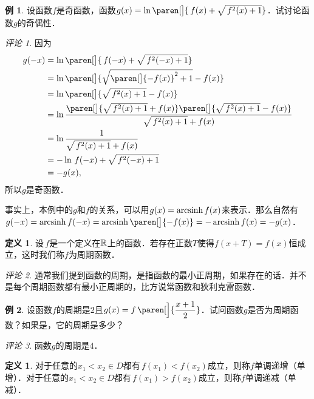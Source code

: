 \documentclass[a4paper,punct=CCT]{ctexbook}
\theoremstyle{definition}
\newtheorem{definition}{定义}
\newtheorem*{definition*}{定义}
\newtheorem*{example*}{例}
\theoremstyle{remark}
\newtheorem*{remark}{评论}
\begin{document}
\begin{example*}
  设函数\(f\)是奇函数，函数\(g(x) = \ln\paren[\big]{\,f(x) + \sqrt{\,f^2(x)+1}}\)．试讨论函数\(g\)的奇偶性．

  \begin{remark}
    因为
    \[
      \begin{split}
        g(-x)
        &= \ln\paren[\big]{\,f(-x) + \sqrt{\,f^2(-x)+1}} \\
        &= \ln\paren[\big]{\sqrt{\paren[\big]{-f(x)}^2+1} - f(x)} \\
        &= \ln\paren[\big]{\sqrt{\,f^2(x)+1} - f(x)} \\
        &= \ln{\frac{\paren[\big]{\sqrt{\,f^2(x)+1} + f(x)}\paren[\big]{\sqrt{\,f^2(x)+1} - f(x)}}{\sqrt{\,f^2(x)+1} + f(x)}} \\
        &= \ln \frac1{\sqrt{\,f^2(x)+1} + f(x)} \\
        &= -\ln{\,f(-x) + \sqrt{\,f^2(-x)+1}} \\
        &= -g(x),
      \end{split}
    \]
    所以\(g\)是奇函数．

    事实上，本例中的\(g\)和\(f\)的关系，可以用\(g(x) = \operatorname{arcsinh} f(x)\)来表示．那么自然有\(g(-x) = \arcsinh f(-x) = \arcsinh\paren[\big]{-f(x)} = - \arcsinh f(x) = -g(x)\)．
  \end{remark}
\end{example*}

\begin{definition*}
  设\(\,f\)是一个定义在\(\mathbb{R}\)上的函数．若存在正数\(T\)使得\(f(x+T) = f(x)\)恒成立，这时我们称\(f\)为周期函数．

  \begin{remark}
    通常我们提到函数的周期，是指函数的最小正周期，如果存在的话．并不是每个周期函数都有最小正周期的，比方说常函数和狄利克雷函数．
  \end{remark}
\end{definition*}

\begin{example*}
  设函数\(f\)的周期是\(2\)且\(g(x) = f\,\paren[\Big]{\dfrac{x+1}{2}}\)．试问函数\(g\)是否为周期函数？如果是，它的周期是多少？

  \begin{remark}
    函数\(g\)的周期是\(4\)．
  \end{remark}
\end{example*}

\begin{definition}
  \label{defn:funcmono}
  对于任意的\(x_1 < x_2 \in D\)都有\(\,f(x_1) < f(x_2)\)成立，则称\(f\)单调递增（单增）．对于任意的\(x_1 < x_2 \in D\)都有\(\,f(x_1) > f(x_2)\)成立，则称\(f\)单调递减（单减）．
\end{definition}
\end{document}
